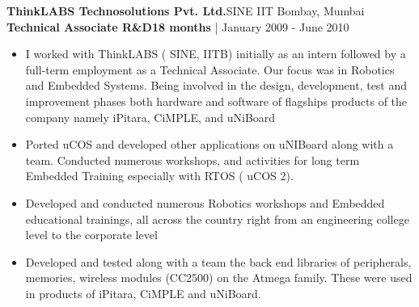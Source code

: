 \vspace{12pt}

\textbf{ThinkLABS Technosolutions Pvt. Ltd.}\hfill{SINE IIT Bombay, Mumbai}
\newline
\textbf{Technical Associate R\&D}\hfill{\textbf{18 months} | January 2009 - June 2010}%
\begin{itemize}
            \item {I worked with ThinkLABS ( SINE, IITB) initially as an intern followed by a full-term employment as a Technical Associate. Our focus was in Robotics and Embedded Systems. Being involved in the design, development, test and improvement phases both hardware and software of flagships products of the company namely iPitara, CiMPLE, and uNiBoard}
            \item {Ported uCOS and developed other applications on uNIBoard along with a team. Conducted numerous workshops, and activities for long term Embedded Training especially with RTOS ( uCOS 2).}
            \item {Developed and conducted numerous Robotics workshops and Embedded educational trainings, all across the country right from an engineering college level to the corporate level}
            \item {Developed and tested along with a team the back end libraries of peripherals, memories, wireless modules (CC2500) on the Atmega family. These were used in products of iPitara, CiMPLE and uNiBoard.}

\end{itemize}
